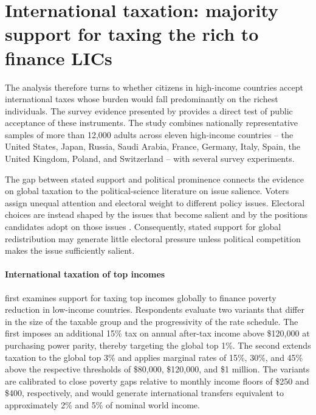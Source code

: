 \section{International taxation: majority support for taxing the rich to finance LICs}

The analysis therefore turns to whether citizens in high-income countries accept %
international taxes whose burden would fall predominantly on the richest individuals. %
The survey evidence presented by \citet{fabre_public_2026} provides a direct test of public acceptance of these instruments. The study combines nationally representative samples of more than 12,000 adults across eleven high-income countries -- the United States, Japan, Russia, Saudi Arabia, France, Germany, Italy, Spain, the United Kingdom, Poland, and Switzerland -- with several survey experiments. %

The gap between stated support and political prominence connects the evidence on global taxation to the political-science literature on issue salience. Voters assign unequal attention and electoral weight to different policy issues. Electoral choices are instead shaped by the issues that become salient and by the positions candidates adopt on those issues \citep{repass_issue_1971,krosnick_role_1988,edwards_explaining_1995,dennison_review_2019}. Consequently, stated support for global redistribution may generate little electoral pressure unless political competition makes the issue sufficiently salient.

\paragraph{International taxation of top incomes}
\citet{fabre_public_2026} first examines support for taxing top incomes globally to finance poverty reduction in low-income countries. Respondents evaluate %
two variants that differ in the size of the taxable group and the progressivity of the rate schedule. The first imposes an additional 15\% tax on annual after-tax income above \$120,000 at purchasing power parity, thereby targeting the global top 1\%. The second extends taxation to the global top 3\% and applies marginal rates of 15\%, 30\%, and 45\% above the respective thresholds of \$80,000, \$120,000, and \$1 million. The variants are calibrated to close poverty gaps relative to monthly income floors of \$250 and \$400, respectively, and would generate international transfers equivalent to approximately 2\% and 5\% of nominal world income.

